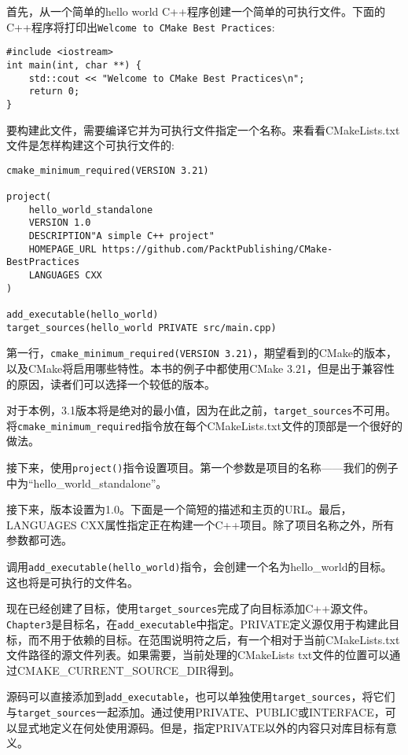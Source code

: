 首先，从一个简单的hello world C++程序创建一个简单的可执行文件。下面的C++程序将打印出\texttt{Welcome to CMake Best Practices}:

\begin{lstlisting}[style=styleCXX]
#include <iostream>
int main(int, char **) {
	std::cout << "Welcome to CMake Best Practices\n";
	return 0;
}
\end{lstlisting}

要构建此文件，需要编译它并为可执行文件指定一个名称。来看看CMakeLists.txt文件是怎样构建这个可执行文件的:

\begin{lstlisting}[style=styleCMake]
cmake_minimum_required(VERSION 3.21)

project(
	hello_world_standalone
	VERSION 1.0
	DESCRIPTION"A simple C++ project"
	HOMEPAGE_URL https://github.com/PacktPublishing/CMake-BestPractices
	LANGUAGES CXX
)

add_executable(hello_world)
target_sources(hello_world PRIVATE src/main.cpp)
\end{lstlisting}

第一行，\texttt{cmake\_minimum\_required(VERSION 3.21)}，期望看到的CMake的版本，以及CMake将启用哪些特性。本书的例子中都使用CMake 3.21，但是出于兼容性的原因，读者们可以选择一个较低的版本。

对于本例，3.1版本将是绝对的最小值，因为在此之前，\texttt{target\_sources}不可用。将\texttt{cmake\_minimum\_required}指令放在每个CMakeLists.txt文件的顶部是一个很好的做法。

接下来，使用\texttt{project()}指令设置项目。第一个参数是项目的名称——我们的例子中为“hello\_world\_standalone”。

接下来，版本设置为1.0。下面是一个简短的描述和主页的URL。最后，LANGUAGES CXX属性指定正在构建一个C++项目。除了项目名称之外，所有参数都可选。

调用\texttt{add\_executable(hello\_world)}指令，会创建一个名为hello\_world的目标。这也将是可执行的文件名。

现在已经创建了目标，使用\texttt{target\_sources}完成了向目标添加C++源文件。\texttt{Chapter3}是目标名，在\texttt{add\_executable}中指定。PRIVATE定义源仅用于构建此目标，而不用于依赖的目标。在范围说明符之后，有一个相对于当前CMakeLists.txt文件路径的源文件列表。如果需要，当前处理的CMakeLists txt文件的位置可以通过CMAKE\_CURRENT\_SOURCE\_DIR得到。

源码可以直接添加到\texttt{add\_executable}，也可以单独使用\texttt{target\_sources}，将它们与\texttt{target\_sources}一起添加。通过使用PRIVATE、PUBLIC或INTERFACE，可以显式地定义在何处使用源码。但是，指定PRIVATE以外的内容只对库目标有意义。

